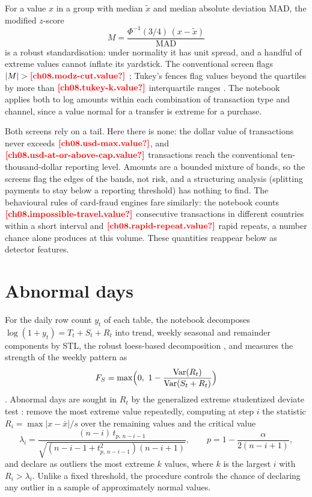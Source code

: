 For a value $x$ in a group with median $\tilde x$ and median absolute deviation $\mathrm{MAD}$, the modified $z$-score
\begin{equation}\label{eq:ad-modz}
  M = \frac{\Phi^{-1}(3/4)\,(x - \tilde x)}{\mathrm{MAD}}
\end{equation}
is a robust standardisation: under normality it has unit spread, and a handful of extreme values cannot inflate its
yardstick. The conventional screen flags $\lvert M \rvert > \est{ch08.modz-cut}{value}$ \autocite{iglewicz1993}; Tukey's fences flag
values beyond the quartiles by more than $\est{ch08.tukey-k}{value}$ interquartile ranges \autocite{tukey1977}. The notebook applies both to
log amounts within each combination of transaction type and channel, since a value normal for a transfer is extreme
for a purchase.

Both screens rely on a tail. Here there is none: the dollar value of transactions never exceeds
$\est{ch08.usd-max}{value}$, and $\est{ch08.usd-at-or-above-cap}{value}$ transactions reach the conventional
ten-thousand-dollar reporting level. Amounts are a bounded mixture of bands, so the screens flag the edges of the bands,
not risk, and a structuring analysis (splitting payments to stay below a reporting threshold) has nothing to find. The
behavioural rules of card-fraud engines fare similarly: the notebook counts $\est{ch08.impossible-travel}{value}$
consecutive transactions in different countries within a short interval and $\est{ch08.rapid-repeat}{value}$ rapid
repeats, a number chance alone produces at this volume. These quantities reappear below as detector features.

\section{Abnormal days}\label{sec:ad-days}

For the daily row count $y_t$ of each table, the notebook decomposes $\log(1 + y_t) = T_t + S_t + R_t$ into trend,
weekly seasonal and remainder components by STL, the robust loess-based decomposition \autocite{cleveland1990}, and
measures the strength of the weekly pattern as
\begin{equation}\label{eq:ad-strength}
  F_S = \max\Bigl(0,\ 1 - \frac{\operatorname{Var}(R_t)}{\operatorname{Var}(S_t + R_t)}\Bigr)
\end{equation}
\autocite{wang2006}. Abnormal days are sought in $R_t$ by the generalized extreme studentized deviate test
\autocite{rosner1983}: remove the most extreme value repeatedly, computing at step $i$ the statistic
$R_i = \max \lvert x - \bar x \rvert / s$ over the remaining values and the critical value
\begin{equation}\label{eq:ad-esd}
  \lambda_i = \frac{(n - i)\, t_{p,\,n-i-1}}{\sqrt{(n - i - 1 + t^2_{p,\,n-i-1})(n - i + 1)}}, \qquad
  p = 1 - \frac{\alpha}{2 (n - i + 1)},
\end{equation}
and declare as outliers the most extreme $k$ values, where $k$ is the largest $i$ with $R_i > \lambda_i$. Unlike a
fixed threshold, the procedure controls the chance of declaring any outlier in a sample of approximately normal
values.

